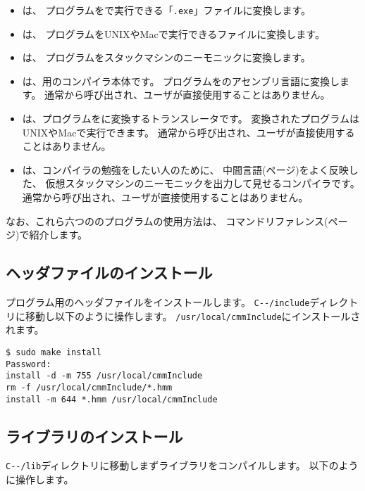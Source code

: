 \begin{itemize}
\item {\cme}は、
{\cmm}プログラムを{\tac}で実行できる「{\tt .exe}」ファイルに変換します。
\item {\cmc}は、
{\cmm}プログラムをUNIXやMacで実行できるファイルに変換します。
\item {\cmv}は、
{\cmm}プログラムをスタックマシンのニーモニックに変換します。
\item {\cmmc}は、{\tac}用の{\cmml}コンパイラ本体です。
{\cmm}プログラムを{\tac}のアセンブリ言語に変換します。
通常{\cme}から呼び出され、ユーザが直接使用することはありません。
\item {\ccmmc}は、{\cmm}プログラムを{\cl}に変換するトランスレータです。
変換された{\cl}プログラムはUNIXやMacで実行できます。
通常{\cmc}から呼び出され、ユーザが直接使用することはありません。
\item {\vcmmc}は、コンパイラの勉強をしたい人のために、
中間言語(\pageref{app:vm}ページ)をよく反映した、
仮想スタックマシンのニーモニックを出力して見せるコンパイラです。
通常{\cmv}から呼び出され、ユーザが直接使用することはありません。
\end{itemize}

なお、これら六つののプログラムの使用方法は、
コマンドリファレンス(\pageref{app:command}ページ)で紹介します。

\subsection{ヘッダファイルのインストール}

{\cmml}プログラム用のヘッダファイルをインストールします。
\verb;C--/include;ディレクトリに移動し以下のように操作します。
\verb;/usr/local/cmmInclude;にインストールされます。

\begin{mylist}
\begin{verbatim}
$ sudo make install
Password:
install -d -m 755 /usr/local/cmmInclude
rm -f /usr/local/cmmInclude/*.hmm
install -m 644 *.hmm /usr/local/cmmInclude
\end{verbatim}
\end{mylist}

\subsection{ライブラリのインストール}

\verb;C--/lib;ディレクトリに移動しまずライブラリをコンパイルします。
以下のように操作します。

